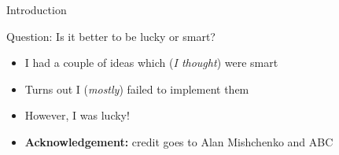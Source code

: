 \begin{frame}[t]{Introduction}
	\begin{block}{Question: Is it better to be lucky or smart?}
		\begin{itemize}
			\pause
			\item I had a couple of ideas which (\textit{I thought}) were smart
			\item Turns out I (\textit{mostly}) failed to implement them
			\pause
			\item However, I was lucky!
			\item \textbf{Acknowledgement:} credit goes to Alan Mishchenko and ABC
		\end{itemize}
	\end{block}
\end{frame}

